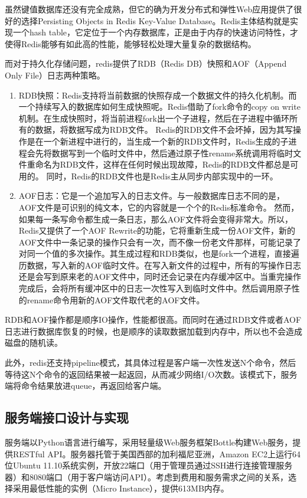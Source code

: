 \documentclass{article}
\begin{document}
\begin{CJK}{UTF8}{gbsn}
  虽然键值数据库还没有完全成熟，但它的确为开发分布式和弹性Web应用提供了很好的选择\cite{REDIS}Persisting Objects in Redis Key-Value Database。Redis主体结构就是实现一个hash table，它定位于一个内存数据库，正是由于内存的快速访问特性，才使得Redis能够有如此高的性能，能够轻松处理大量复杂的数据结构。

  而对于持久化存储问题，redis提供了RDB（Redis DB）快照和AOF（Append Only File）日志两种策略。

  \begin{enumerate}
		\item RDB快照：Redis支持将当前数据的快照存成一个数据文件的持久化机制。而一个持续写入的数据库如何生成快照呢。Redis借助了fork命令的copy on write机制。在生成快照时，将当前进程fork出一个子进程，然后在子进程中循环所有的数据，将数据写成为RDB文件。
      Redis的RDB文件不会坏掉，因为其写操作是在一个新进程中进行的，当生成一个新的RDB文件时，Redis生成的子进程会先将数据写到一个临时文件中，然后通过原子性rename系统调用将临时文件重命名为RDB文件，这样在任何时候出现故障，Redis的RDB文件都总是可用的。
      同时，Redis的RDB文件也是Redis主从同步内部实现中的一环。
		\item AOF日志：它是一个追加写入的日志文件。与一般数据库日志不同的是，AOF文件是可识别的纯文本，它的内容就是一个个的Redis标准命令。
      然而，如果每一条写命令都生成一条日志，那么AOF文件将会变得非常大。所以，Redis又提供了一个AOF Rewrite的功能，它将重新生成一份AOF文件，新的AOF文件中一条记录的操作只会有一次，而不像一份老文件那样，可能记录了对同一个值的多次操作。其生成过程和RDB类似，也是fork一个进程，直接遍历数据，写入新的AOF临时文件。在写入新文件的过程中，所有的写操作日志还是会写到原来老的AOF文件中，同时还会记录在内存缓冲区中。当重完操作完成后，会将所有缓冲区中的日志一次性写入到临时文件中。然后调用原子性的rename命令用新的AOF文件取代老的AOF文件。
  \end{enumerate}

  RDB和AOF操作都是顺序IO操作，性能都很高。而同时在通过RDB文件或者AOF日志进行数据库恢复的时候，也是顺序的读取数据加载到内存中，所以也不会造成磁盘的随机读。

  此外，redis还支持pipeline模式，其具体过程是客户端一次性发送N个命令，然后等待这N个命令的返回结果被一起返回，从而减少网络I/O次数。该模式下，服务端将命令结果放进queue，再返回给客户端。

  \subsection{服务端接口设计与实现}
  服务端以Python语言进行编写，采用轻量级Web服务框架Bottle构建Web服务，提供RESTful API。服务器托管于美国西部的加利福尼亚洲，Amazon EC2上运行64位Ubuntu 11.10系统实例，开放22端口（用于管理员通过SSH进行连接管理服务器）和8080端口（用于客户端访问API）。考虑到费用和服务需求之间的关系，选择采用最低性能的实例（Micro Instance），提供613MB内存。


\end{CJK}
\end{document}
